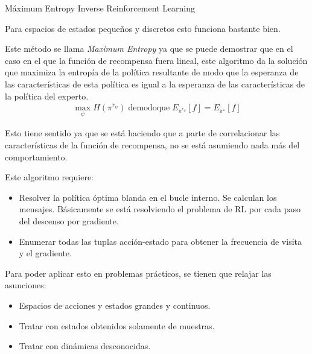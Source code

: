 \begin{algorithm}
    \caption{Máximum Entropy Inverse Reinforcement Learning}
\end{algorithm}

Para espacios de estados pequeños y discretos esto funciona bastante bien.

Este método se llama \textit{Maximum Entropy} ya que se puede demostrar que en el caso en el que
la función de recompensa fuera lineal, este algoritmo da la solución que maximiza la entropía
de la política resultante de modo que la esperanza de las características de esta política es
igual a la esperanza de las características de la política del experto.
\begin{align}
\operatorname { max } _ { \psi } H ( \pi ^ { r _ { \psi } } ) \operatorname { de modo que } E _ { \pi ^ { r _ { \psi } } } [ f ] = E _ { \pi ^ { \star } } [ f ]
\end{align}

Esto tiene sentido ya que se está haciendo que a parte de correlacionar las características de
la función de recompensa, no se está asumiendo nada más del comportamiento.

Este algoritmo requiere:
\begin{itemize}
    \item Resolver la política óptima blanda en el bucle interno. Se calculan los
        mensajes. Básicamente se está resolviendo el problema de RL por cada paso del descenso
        por gradiente.
    \item Enumerar todas las tuplas acción-estado para obtener la frecuencia de visita y el
        gradiente.
\end{itemize}

Para poder aplicar esto en problemas prácticos, se tienen que relajar las asunciones:
\begin{itemize}
    \item Espacios de acciones y estados grandes y continuos.
    \item Tratar con estados obtenidos solamente de muestras.
    \item Tratar con dinámicas desconocidas.
\end{itemize}

